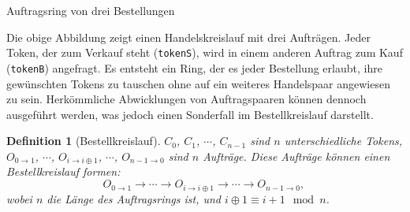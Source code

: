 \documentclass[UTF8,nofonts]{article}
\makeatletter
\newtheorem{definition}{Definition}[section]
\newenvironment{figurehere}
 {\def\@captype{figure}}
 {}
\makeatother
\begin{document}
\begin{multicols}{2}
\begin{center}
\begin{figurehere}

\caption{Auftragsring von drei Bestellungen}
\label{fig:ring}
\end{figurehere}
\end{center}


Die obige Abbildung zeigt einen Handelskreislauf mit drei Aufträgen. Jeder Token, der zum Verkauf steht (\verb|tokenS|), wird in einem anderen Auftrag zum Kauf (\verb|tokenB|) angefragt. Es entsteht ein Ring, der es jeder Bestellung erlaubt, ihre gewünschten Tokens zu tauschen ohne auf ein weiteres Handelspaar angewiesen zu sein. Herkömmliche Abwicklungen von Auftragspaaren können dennoch ausgeführt werden, was jedoch einen Sonderfall im Bestellkreislauf darstellt.

\begin{definition}[Bestellkreislauf] $C_{0}$, $C_{1}$, $\cdots$, $C_{n-1}$ sind $n$ unterschiedliche Tokens, $O_{0\rightarrow 1}$, $\cdots$, $O_{i\rightarrow i\oplus 1}$, $\cdots$, $O_{n-1 \rightarrow 0}$ sind $n$ Aufträge. Diese Aufträge können einen Bestellkreislauf formen:
$$O_{0\rightarrow 1} \rightarrow \cdots \rightarrow O_{i\rightarrow i\oplus 1} \rightarrow \cdots \rightarrow O_{n-1\rightarrow 0} \text{, }$$
wobei $n$ die Länge des Auftragsrings ist, und $i\oplus 1 \equiv i+1 \mod n$.
\end{definition}


\end{multicols}
\end{document}
